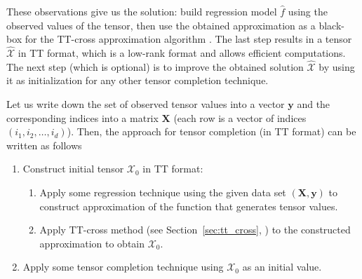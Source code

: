 These observations give us the solution: build regression model $\widehat{f}$ using the observed values of the tensor, then use the obtained approximation as a black-box for the TT-cross approximation algorithm \citep{oseledets2010tt}.
The last step results in a tensor $\widehat{\mathcal{X}}$ in TT format, which is a low-rank format and allows efficient computations.
The next step (which is optional) is to improve the obtained solution $\widehat{\mathcal{X}}$ by using it as initialization for any other tensor completion technique.


Let us write down the set of observed tensor values into a vector $\mathbf{y}$
and the corresponding indices into a matrix $\mathbf{X}$ (each row is a vector of indices
$(i_1, i_2, \ldots, i_d)$).
Then, the approach for tensor completion (in TT format) can be
written as follows

\begin{enumerate}
    \item Construct initial tensor $\mathcal{X}_0$ in TT format:
        \begin{enumerate}
        \item Apply some regression technique using the given data set $(\mathbf{X}, \mathbf{y})$ to construct approximation of the function that generates tensor values.
        \item Apply TT-cross method (see Section~\ref{sec:tt_cross}, \citep{oseledets2010tt}) to the constructed approximation to obtain $\mathcal{X}_0$.
        \end{enumerate}
    \item Apply some tensor completion technique using $\mathcal{X}_0$
    as an initial value.
\end{enumerate}

